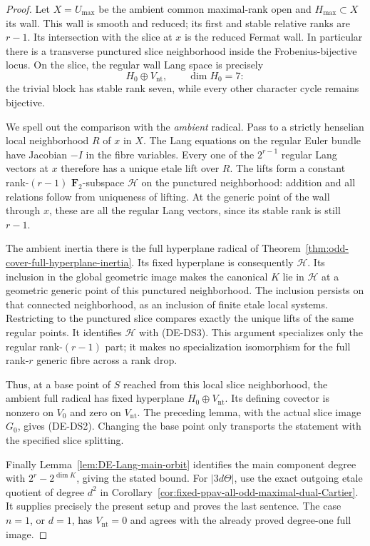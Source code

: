 \begin{proof}
Let \(X=U_{\max}\) be the ambient common maximal-rank open and
\(H_{\max}\subset X\) its wall. This wall is smooth and reduced;
its first and stable relative ranks are \(r-1\). Its intersection
with the slice at \(x\) is the reduced Fermat wall. In particular
there is a transverse punctured slice neighborhood inside the
Frobenius-bijective locus. On the slice, the regular wall Lang
space is precisely
\[
                    H_0\oplus V_{\mathrm{nt}},
                    \qquad \dim H_0=7:
 \tag{DE-DS3}
\]
the trivial block has stable rank seven, while every other character
cycle remains bijective.

We spell out the comparison with the \emph{ambient} radical. Pass
to a strictly henselian local neighborhood \(R\) of \(x\) in \(X\).
The Lang equations on the regular Euler bundle have Jacobian
\(-I\) in the fibre variables. Every one of the \(2^{r-1}\)
regular Lang vectors at \(x\) therefore has a unique etale lift
over \(R\). The lifts form a constant rank-\((r-1)\)
\(\mathbf F_2\)-subspace \(\mathcal H\) on the punctured
neighborhood: addition and all relations follow from uniqueness
of lifting. At the generic point of the wall through \(x\),
these are all the regular Lang vectors, since its stable rank is
still \(r-1\).

The ambient inertia there is the full hyperplane radical of
Theorem~\ref{thm:odd-cover-full-hyperplane-inertia}. Its fixed
hyperplane is consequently \(\mathcal H\). Its inclusion in the
global geometric image makes the canonical \(K\) lie in
\(\mathcal H\) at a geometric generic point of this punctured
neighborhood. The inclusion persists on that connected neighborhood,
as an inclusion of finite etale local systems. Restricting to the
punctured slice compares exactly the unique lifts of the same
regular points. It identifies \(\mathcal H\) with (DE-DS3).
This argument specializes only the regular rank-\((r-1)\) part;
it makes no specialization isomorphism for the full rank-\(r\)
generic fibre across a rank drop.

Thus, at a base point of \(S\) reached from this local slice
neighborhood, the ambient full radical has fixed hyperplane
\(H_0\oplus V_{\mathrm{nt}}\). Its defining covector is nonzero
on \(V_0\) and zero on \(V_{\mathrm{nt}}\). The preceding lemma,
with the actual slice image \(G_0\), gives (DE-DS2).
Changing the base point only transports the statement with the
specified slice splitting.

Finally Lemma~\ref{lem:DE-Lang-main-orbit} identifies the main
component degree with \(2^r-2^{\dim K}\), giving the stated bound.
For \(|3d\Theta|\), use the exact outgoing etale quotient of
degree \(d^2\) in
Corollary~\ref{cor:fixed-ppav-all-odd-maximal-dual-Cartier}.
It supplies precisely the present setup and proves the last sentence.
The case \(n=1\), or \(d=1\), has \(V_{\mathrm{nt}}=0\) and
agrees with the already proved degree-one full image.
\end{proof}

